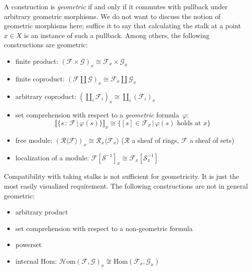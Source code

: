 \documentclass[10pt,reqno,a4paper]{amsbook}
\theoremstyle{definition}
\theoremstyle{plain}
\theoremstyle{remark}
\newcommand{\F}{\mathcal{F}}
\renewcommand{\G}{\mathcal{G}}
\newcommand{\R}{\mathcal{R}}
\renewcommand{\S}{\mathcal{S}}
\newcommand{\Hom}{\mathrm{Hom}}
\newcommand{\HOM}{\mathcal{H}\mathrm{om}}
\newcommand{\?}{\,{:}\,}
\renewcommand{\_}{\mathpunct{.}\,}
\newcommand{\brak}[1]{{\llbracket{#1}\rrbracket}}
\begin{document}
A construction is \emph{geometric}\label{page:geometric-constructions} if and only if it commutes with pullback
under arbitrary geometric morphisms. We do not want to discuss the notion of
geometric morphisms here; suffice it to say that calculating the stalk at a
point~$x \in X$ is an instance of such a pullback. Among others, the following
constructions are geometric:
\begin{itemize}
\item finite product: $(\F \times \G)_x \cong \F_x \times \G_x$
\item finite coproduct: $(\F \amalg \G)_x \cong \F_x \amalg \G_x$
\item arbitrary coproduct: $(\coprod_i \F_i)_x \cong \coprod_i (\F_i)_x$
\item set comprehension with respect to a \emph{geometric} formula~$\varphi$:
\[ \brak{\{ s\?\F \,|\, \varphi(s) \}}_x \cong \{ [s]\in\F_x \,|\,
\text{$\varphi(s)$ holds at $x$} \} \]
\item free module: $(\R\langle \F \rangle)_x \cong \R_x\langle \F_x
\rangle$ ($\R$ a sheaf of rings, $\F$ a sheaf of sets)
\item localization of a module: $\F[\S^{-1}]_x \cong \F_x[\S_x^{-1}]$
\end{itemize}
Compatibility with taking stalks is not sufficient for geometricity.
It is just the most easily visualized requirement.
The following constructions are not in general geometric:
\begin{itemize}
\item arbitrary product
\item set comprehension with respect to a non-geometric formula
\item powerset
\item internal Hom: $\HOM(\F,\G)_x \not\cong \Hom(\F_x,\G_x)$
\end{itemize}
\end{document}
